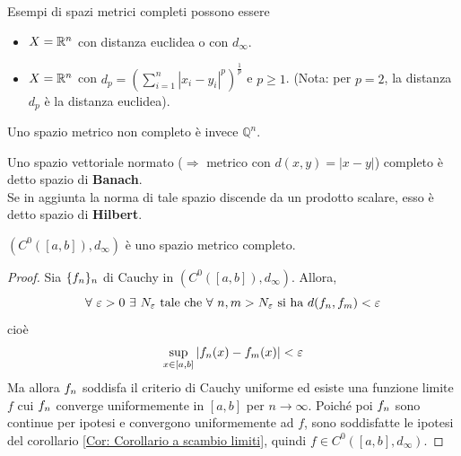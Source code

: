 \begin{example}
    Esempi di spazi metrici completi possono essere
    \begin{itemize}
        \item $X=\mathbb{R}^n$ con distanza euclidea o con $d_\infty$.
        \item $X=\mathbb{R}^n$ con $d_p= \left(\sum\limits_{i=1}^{n}{|x_i - y_i|^p}\right)^{\frac{1}{p}}$ e $p\geq 1$. (Nota: per $p=2$, la distanza $d_p$ è la distanza euclidea).
    \end{itemize}
    Uno spazio metrico non completo è invece $\mathbb{Q}^n$.
\end{example}
\begin{oss}
    Uno spazio vettoriale normato ($\Rightarrow$ metrico con $d(x, y)= |x-y|$) completo è detto spazio di \textbf{Banach}.\\
    Se in aggiunta la norma di tale spazio discende da un prodotto scalare, esso è detto spazio di \textbf{Hilbert}.
\end{oss}
\begin{theorem}
    $(C^0([a,b]), d_\infty)$ è uno spazio metrico completo.
\end{theorem}
\begin{proof}
    Sia $\{f_n\}_n$ di Cauchy in $(C^0([a,b]), d_\infty)$. Allora, 
    \begin{equation*}
          \forall\ \varepsilon>0\ \exists\ N_\varepsilon\ \text{tale che}\ \forall\ n,m > N_\varepsilon\ \text{si ha}\ d(\fn, f_m)< \varepsilon
    \end{equation*}
    cioè 
    \begin{equation*}
     \sup\limits_{x \in [a,b]}{|f_n(x)-f_m(x)|}< \varepsilon
    \end{equation*}
    Ma allora $f_n$ soddisfa il criterio di Cauchy uniforme ed esiste una funzione limite $f$ cui $f_n$ converge uniformemente in $[a,b]$ per $n \to \infty$. Poiché poi $f_n$ sono continue per ipotesi e convergono uniformemente ad $f$, sono soddisfatte le ipotesi del corollario \ref{Cor: Corollario a scambio limiti}, quindi $f \in C^0([a,b], d_\infty)$.
\end{proof}
